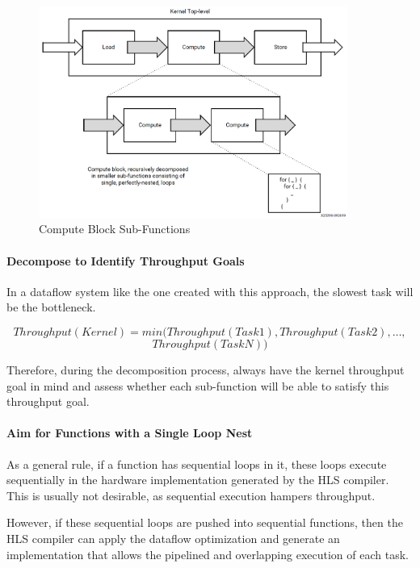 \begin{figure}[H]
    \begin{center}
        \includegraphics[width=0.9\textwidth]{images/computeSubFunctions.PNG}
        \caption{Compute Block Sub-Functions}
        \label{computeSubFunctions}
    \end{center}
\end{figure}

\paragraph{Decompose to Identify Throughput Goals}
In a dataflow system like the one created with this approach, the slowest task will be the bottleneck.

\[ Throughput(Kernel) = min(Throughput(Task1), Throughput(Task2), \dots,\]
\[ Throughput(TaskN)) \]

Therefore, during the decomposition process, always have the kernel throughput goal in mind and assess whether each sub-function will be able to satisfy this throughput goal.

\paragraph{Aim for Functions with a Single Loop Nest}
As a general rule, if a function has sequential loops in it, these loops execute sequentially in the hardware implementation generated by the HLS compiler. This is usually not desirable, as sequential execution hampers throughput.

\par However, if these sequential loops are pushed into sequential functions, then the HLS compiler can apply the dataflow optimization and generate an implementation that allows the pipelined and overlapping execution of each task. 

